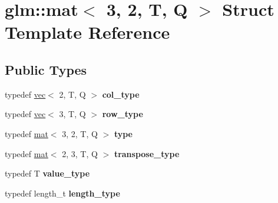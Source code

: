 \hypertarget{structglm_1_1mat_3_013_00_012_00_01T_00_01Q_01_4}{}\section{glm\+:\+:mat$<$ 3, 2, T, Q $>$ Struct Template Reference}
\label{structglm_1_1mat_3_013_00_012_00_01T_00_01Q_01_4}
\subsection*{Public Types}
\begin{DoxyCompactItemize}
\item 
\mbox{\label{structglm_1_1mat_3_013_00_012_00_01T_00_01Q_01_4_aa610dcaaae528e1eea8bdaaa435ad3a4}} 
typedef \hyperlink{structglm_1_1vec}{vec}$<$ 2, T, Q $>$ {\bfseries col\+\_\+type}
\item 
\mbox{\label{structglm_1_1mat_3_013_00_012_00_01T_00_01Q_01_4_a0b91ceeaafce26ca1b6b64f8ea34dbb1}} 
typedef \hyperlink{structglm_1_1vec}{vec}$<$ 3, T, Q $>$ {\bfseries row\+\_\+type}
\item 
\mbox{\label{structglm_1_1mat_3_013_00_012_00_01T_00_01Q_01_4_acc76b4ad182b342b586dce28e0da8e16}} 
typedef \hyperlink{structglm_1_1mat}{mat}$<$ 3, 2, T, Q $>$ {\bfseries type}
\item 
\mbox{\label{structglm_1_1mat_3_013_00_012_00_01T_00_01Q_01_4_ab5fe2bf92b71a51cd33be87c6c9ef7d1}} 
typedef \hyperlink{structglm_1_1mat}{mat}$<$ 2, 3, T, Q $>$ {\bfseries transpose\+\_\+type}
\item 
\mbox{\label{structglm_1_1mat_3_013_00_012_00_01T_00_01Q_01_4_ae1e6e1cc8ff07c13ae805cabd6cefd77}} 
typedef T {\bfseries value\+\_\+type}
\item 
\mbox{\label{structglm_1_1mat_3_013_00_012_00_01T_00_01Q_01_4_ac2f268fa5e899b2a6ad8139183ed61d4}} 
typedef length\+\_\+t {\bfseries length\+\_\+type}
\end{DoxyCompactItemize}
